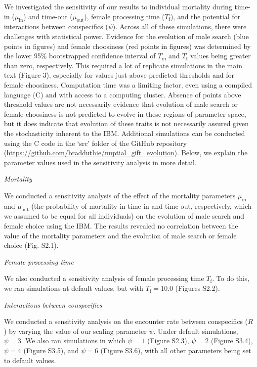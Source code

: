 \documentclass[
]{article}
\begin{document}
We investigated the sensitivity of our results to individual mortality
during time-in (\(\mu_{\mathrm{in}}\)) and time-out
(\(\mu_{\mathrm{out}}\)), female processing time (\(T_{\mathrm{f}}\)),
and the potential for interactions between conspecifics (\(\psi\)).
Across all of these simulations, there were challenges with statistical
power. Evidence for the evolution of male search (blue points in
figures) and female choosiness (red points in figures) was determined by
the lower 95\% bootstrapped confidence interval of \(T_{\mathrm{m}}\)
and \(T_{\mathrm{f}}\) values being greater than zero, respectively.
This required a lot of replicate simulations in the main text (Figure
3), especially for values just above predicted thresholds and for female
choosiness. Computation time was a limiting factor, even using a
compiled language (C) and with access to a computing cluster. Absence of
points above threshold values are not necessarily evidence that
evolution of male search or female choosiness is not predicted to evolve
in these regions of parameter space, but it does indicate that evolution
of these traits is not necessarily assured given the stochasticity
inherent to the IBM. Additional simulations can be conducted using the C
code in the `src' folder of the GitHub repository
(\url{https://github.com/bradduthie/nuptial_gift_evolution}). Below, we
explain the parameter values used in the sensitivity analysis in more
detail.

\emph{Mortality}

We conducted a sensitivity analysis of the effect of the mortality
parameters \(\mu_{\mathrm{in}}\) and \(\mu_{\mathrm{out}}\) (the
probability of mortality in time-in and time-out, respectively, which we
assumed to be equal for all individuals) on the evolution of male search
and female choice using the IBM. The results revealed no correlation
between the value of the mortality parameters and the evolution of male
search or female choice (Fig. S2.1).

\emph{Female processing time}

We also conducted a sensitivity analysis of female processing time
\(T_{\mathrm{f}}\). To do this, we ran simulations at default values,
but with \(T_{\mathrm{f}} = 10.0\) (Figures S2.2).

\emph{Interactions between conspecifics}

We conducted a sensitivity analysis on the encounter rate between
conspecifics (\(R\)) by varying the value of our scaling parameter
\(\psi\). Under default simulations, \(\psi = 3\). We also ran
simulations in which \(\psi = 1\) (Figure S2.3), \(\psi = 2\) (Figure
S3.4), \(\psi = 4\) (Figure S3.5), and \(\psi = 6\) (Figure S3.6), with
all other parameters being set to default values.
\end{document}
